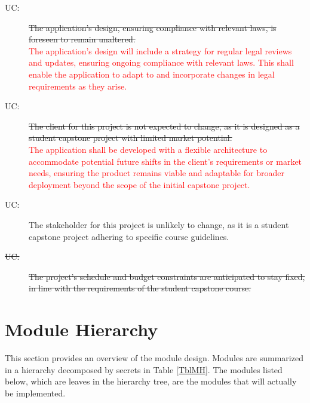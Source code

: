 \documentclass[12pt, titlepage]{article}
\newcommand{\rt}[1]{\textcolor{red}{#1}}
\newcounter{ucnum}
\newcommand{\uctheucnum}{UC\theucnum}
\begin{document}
\begin{description}
\item[ \uctheucnum:] \sout{The application's design, ensuring compliance with relevant laws, is foreseen to remain unaltered.}\\
    \rt{The application’s design will include a strategy for regular legal reviews and updates, ensuring ongoing compliance with relevant laws. This shall enable the application to adapt to and incorporate changes in legal requirements as they arise.}

\item[ \uctheucnum:] \sout{The client for this project is not expected to change, as it is designed as a student capstone project with limited market potential.}\\
    \rt{The application shall be developed with a flexible architecture to accommodate potential future shifts in the client's requirements or market needs, ensuring the product remains viable and adaptable for broader deployment beyond the scope of the initial capstone project.}

\item[ \uctheucnum:] The stakeholder for this project is unlikely to change, as it is a student capstone project adhering to specific course guidelines.

\item[ \sout{\uctheucnum:}] \sout{The project's schedule and budget constraints are anticipated to stay fixed, in line with the requirements of the student capstone course.}
\end{description}

\section{Module Hierarchy} \label{SecMH}

This section provides an overview of the module design. Modules are summarized
in a hierarchy decomposed by secrets in Table \ref{TblMH}. The modules listed
below, which are leaves in the hierarchy tree, are the modules that will
actually be implemented.
\end{document}
